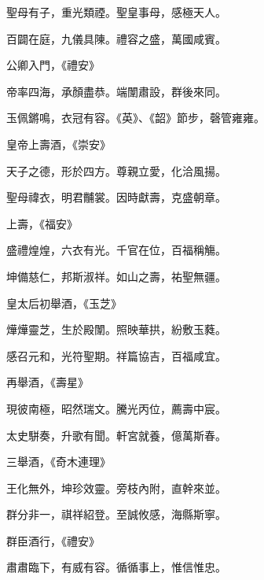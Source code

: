 \begin{pinyinscope}
 聖母有子，重光類禋。聖皇事母，感極天人。



 百闢在庭，九儀具陳。禮容之盛，萬國咸賓。



 公卿入門，《禮安》



 帝率四海，承顏盡恭。端闈肅設，群後來同。



 玉佩鏘鳴，衣冠有容。《英》、《韶》節步，磬管雍雍。



 皇帝上壽酒，《崇安》



 天子之德，形於四方。尊親立愛，化洽風揚。



 聖母禕衣，明君黼裳。因時獻壽，克盛朝章。



 上壽，《福安》



 盛禮煌煌，六衣有光。千官在位，百福稱觴。



 坤備慈仁，邦斯淑祥。如山之壽，祐聖無疆。



 皇太后初舉酒，《玉芝》



 燁燁靈芝，生於殿闈。照映華拱，紛敷玉蕤。



 感召元和，光符聖期。祥篇協吉，百福咸宜。



 再舉酒，《壽星》



 現彼南極，昭然瑞文。騰光丙位，薦壽中宸。



 太史駢奏，升歌有聞。軒宮就養，億萬斯春。



 三舉酒，《奇木連理》



 王化無外，坤珍效靈。旁枝內附，直幹來並。



 群分非一，祺祥紹登。至誠攸感，海縣斯寧。



 群臣酒行，《禮安》



 肅肅臨下，有威有容。循循事上，惟信惟忠。




\end{pinyinscope}
